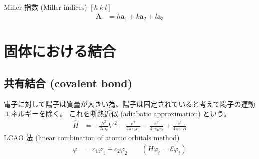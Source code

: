 \documentclass[uplatex,dvipdfmx,a4paper,11pt]{jlreq}
\newcommand{\E}{\mathcal{E}}
\renewcommand{\aa}{\bm{a}}
\begin{document}
\begin{definition}
  Miller 指数 (Miller indices)
  $[h\ k\ l]$
  \begin{align}
    \bm{A} & = h\aa_1 + k\aa_2 + l\aa_3
  \end{align}
\end{definition}



\section{固体における結合}
\subsection{共有結合 (covalent bond)}
電子に対して陽子は質量が大きい為、陽子は固定されていると考えて陽子の運動エネルギーを除く。
これを断熱近似 (adiabatic approximation) という。
\begin{align}
  \hat{H} & = -\frac{\hbar^2}{2m_e}\nabla^2 - \frac{e^2}{4\pi\varepsilon_0r_1} - \frac{e^2}{4\pi\varepsilon_0r_2} + \frac{e^2}{4\pi\varepsilon_0R}
\end{align}
LCAO 法 (linear combination of atomic orbitals method)
\begin{align}
  \varphi & = c_1\varphi_1 + c_2\varphi_2 \qquad (H\varphi_i = \E\varphi_i)
\end{align}
\end{document}
